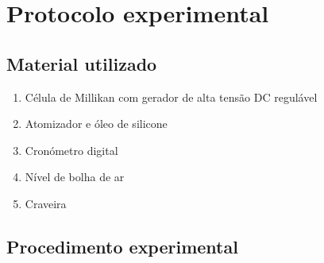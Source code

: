 \documentclass[a4paper,twoside,12pt]{article}      %
\begin{document}
\newpage
\section{\sf Protocolo experimental}


\subsection{\sf Material utilizado}

\begin{enumerate}
    \item Célula de Millikan com gerador de alta tensão DC regulável
    \item  Atomizador e óleo de silicone
    \item Cronómetro digital
    \item Nível de bolha de ar
    \item Craveira
\end{enumerate}
\subsection{\sf Procedimento experimental}
\end{document}
